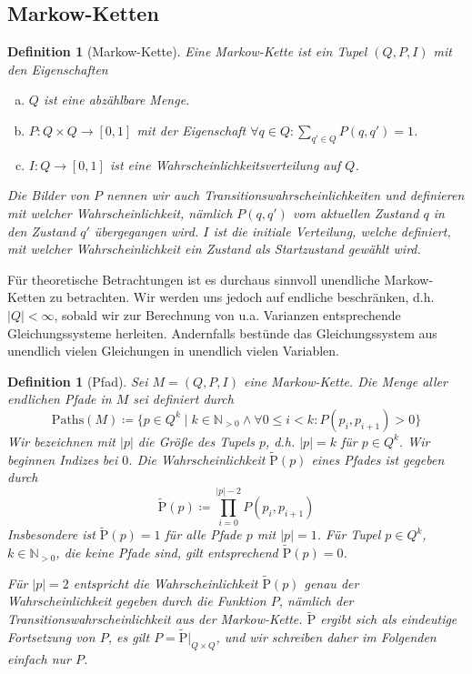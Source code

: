 \documentclass[a4paper]{article}
\newcommand{\mc}{Markow-Kette}
\newtheorem{definition}[satz]{Definition} %
\theoremstyle{nonumberplain}
\begin{document}
	\subsection{\mc{}n}
	
	\newcommand{\mcex}{$M = (Q, P, I)$}
	\begin{definition}[\mc]\label{def-mc}
		Eine \mc{} ist ein Tupel $(Q, P, I)$ mit den Eigenschaften
		\begin{enumerate}[(a)]
			\item $Q$ ist eine abzählbare Menge.
			\item $P : Q \times Q \to [0,1]$ mit der Eigenschaft $\forall q \in Q : \sum_{q' \in Q}{P(q,q') = 1}$.
			\item $I : Q \to [0,1]$ ist eine Wahrscheinlichkeitsverteilung auf $Q$.
		\end{enumerate}	
		Die Bilder von $P$ nennen wir auch Transitionswahrscheinlichkeiten und definieren mit welcher Wahrscheinlichkeit, nämlich $P(q,q')$ vom aktuellen Zustand $q$ in den Zustand $q'$ übergegangen wird. $I$ ist die initiale Verteilung, welche definiert, mit welcher Wahrscheinlichkeit ein Zustand als Startzustand gewählt wird.
	\end{definition}
	
	Für theoretische Betrachtungen ist es durchaus sinnvoll unendliche \mc{}n zu betrachten. Wir werden uns jedoch auf endliche beschränken, d.h. $|Q| < \infty$, sobald wir zur Berechnung von u.a. Varianzen entsprechende Gleichungssysteme herleiten. Andernfalls bestünde das Gleichungssystem aus unendlich vielen Gleichungen in unendlich vielen Variablen.
	
	\newcommand{\gpath}{Pfad}
	\newcommand{\pfin}{\mathrm{Paths}}%
	\begin{definition}[\gpath]\label{def-path}
		Sei \mcex{} eine \mc{}. Die Menge aller endlichen \gpath e in $M$ sei definiert durch
		\begin{equation}
		\pfin(M) \coloneqq \{p \in Q^{k} \mid k \in \mathbb{N}_{>0} \land \forall 0 \leq i < k : P(p_i,p_{i+1}) > 0\}
		\end{equation}
		Wir bezeichnen mit $|p|$ die Größe des Tupels $p$, d.h. $|p| = k$ für $p \in Q^k$. Wir beginnen Indizes bei $0$.
		Die Wahrscheinlichkeit $\mathrm{\tilde{P}}(p)$ eines Pfades ist gegeben durch
		\begin{equation}
		\mathrm{\tilde{P}}(p) \coloneqq \prod_{i = 0}^{|p| - 2}{P(p_i,p_{i+1})}
		\end{equation}
		Insbesondere ist $\mathrm{\tilde{P}}(p) = 1$ für alle Pfade $p$ mit $|p| = 1$. Für Tupel $p \in Q^k$, $k \in \mathbb{N}_{>0}$, die keine Pfade sind, gilt entsprechend $\mathrm{\tilde{P}}(p) = 0$.
		
		Für $|p| = 2$ entspricht die Wahrscheinlichkeit $\mathrm{\tilde{P}}(p)$ genau der Wahrscheinlichkeit gegeben durch die Funktion $P$, nämlich der Transitionswahrscheinlichkeit aus der \mc{}. $\mathrm{\tilde{P}}$ ergibt sich als eindeutige Fortsetzung von $P$, es gilt $P = \mathrm{\tilde{P}}\vert_{Q\times Q}$, und wir schreiben daher im Folgenden einfach nur $P$.
	\end{definition}
	
\end{document}
